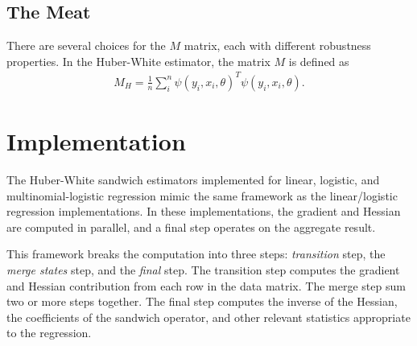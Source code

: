\documentclass[12pt]{article}
\begin{document}
\subsection{The Meat}
There are several choices for the $M$ matrix, each with different robustness properties.  In the Huber-White estimator, the matrix $M$ is defined as
\begin{align}
M_{H} =\frac{1}{n} \sum_i^n \psi(y_i,x_i, \theta)^T  \psi(y_i,x_i, \theta).
\end{align}

%


\section{Implementation}

The Huber-White sandwich estimators implemented for linear, logistic, and multinomial-logistic regression mimic the same framework as  the linear/logistic regression implementations.  In these implementations, the gradient and Hessian are computed in parallel, and a final step operates on the aggregate result.  

This framework breaks the computation into three steps: \textit{transition} step, the \textit{merge states} step, and the \textit{final} step.  The transition step computes the gradient and Hessian contribution from each row in the data matrix. The merge step sum two or more steps together.  The final step computes the inverse of the Hessian, the coefficients of the sandwich operator, and other relevant statistics appropriate to the regression.  %
\end{document}

